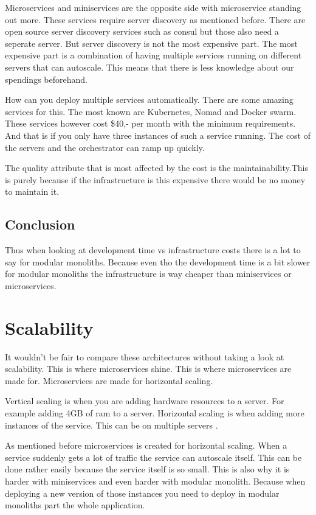 Microservices and miniservices are the opposite side with microservice standing out more. These services require server discovery as mentioned before. There are open source server discovery services such as consul but those also need a seperate server. But server discovery is not the most expensive part. The most expensive part is a combination of having multiple services running on different servers that can autoscale. This means that there is less knowledge about our spendings beforehand.

How can you deploy multiple services automatically. There are some amazing services for this. The most known are Kubernetes, Nomad and Docker swarm. These services however cost \$40,- per month with the minimum requirements. And that is if you only have three instances of such a service running. The cost of the servers and the orchestrator can ramp up quickly.

The quality attribute that is most affected by the cost is the maintainability.This is purely because if the infrastructure is this expensive there would be no money to maintain it.

\subsection{Conclusion}
Thus when looking at development time vs infrastructure costs there is a lot to say for modular monoliths. Because even tho the development time is a bit slower for modular monoliths the infrastructure is way cheaper than miniservices or microservices.

\section{Scalability}
\label{sec:Scalability}

It wouldn’t be fair to compare these architectures without taking a look at scalability. This is where microservices shine. This is where microservices are made for. Microservices are made for horizontal scaling.

Vertical scaling is when you are adding hardware resources to a server. For example adding 4GB of ram to a server. Horizontal scaling is when adding more instances of the service. This can be on multiple servers \cite{microservicesMultipleServer}.

As mentioned before microservices is created for horizontal scaling. When a service suddenly gets a lot of traffic the service can autoscale itself. This can be done rather easily because the service itself is so small. This is also why it is harder with miniservices and even harder with modular monolith. Because when deploying a new version of those instances you need to deploy in modular monoliths part the whole application.

